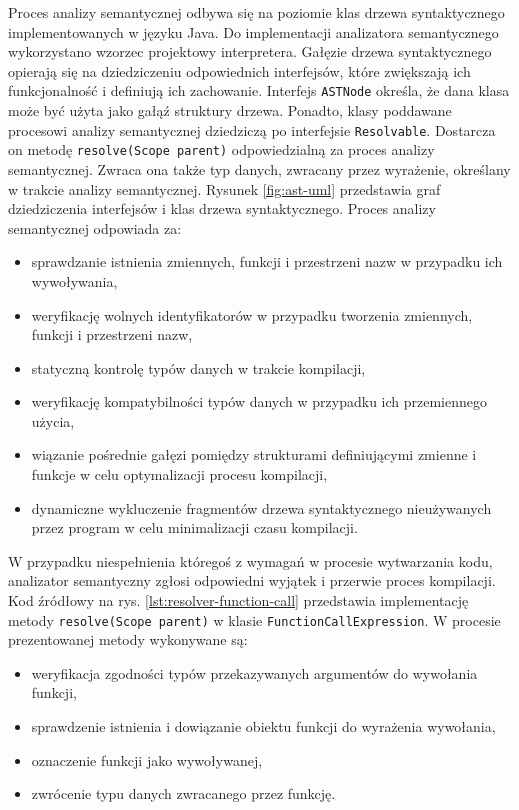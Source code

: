 Proces analizy semantycznej odbywa się na poziomie klas drzewa syntaktycznego implementowanych w języku Java. Do implementacji analizatora semantycznego wykorzystano wzorzec projektowy interpretera. Gałęzie drzewa syntaktycznego opierają się na dziedziczeniu odpowiednich interfejsów, które zwiększają ich funkcjonalność i definiują ich zachowanie. Interfejs \lstinline|ASTNode| określa, że dana klasa może być użyta jako gałąź struktury drzewa. Ponadto, klasy poddawane procesowi analizy semantycznej dziedziczą po interfejsie \lstinline|Resolvable|. Dostarcza on metodę \lstinline|resolve(Scope parent)| odpowiedzialną za proces analizy semantycznej. Zwraca ona także typ danych, zwracany przez wyrażenie, określany w trakcie analizy semantycznej. Rysunek \ref{fig:ast-uml} przedstawia graf dziedziczenia interfejsów i klas drzewa syntaktycznego. Proces analizy semantycznej odpowiada za:
\begin{itemize}
\item sprawdzanie istnienia zmiennych, funkcji i przestrzeni nazw w przypadku ich wywoływania,
\item weryfikację wolnych identyfikatorów w przypadku tworzenia zmiennych, funkcji i przestrzeni nazw,
\item statyczną kontrolę typów danych w trakcie kompilacji,
\item weryfikację kompatybilności typów danych w przypadku ich przemiennego użycia,
\item wiązanie pośrednie gałęzi pomiędzy strukturami definiującymi zmienne i funkcje w celu optymalizacji procesu kompilacji,
\item dynamiczne wykluczenie fragmentów drzewa syntaktycznego nieużywanych przez program w celu minimalizacji czasu kompilacji.
\end{itemize}
W przypadku niespełnienia któregoś z wymagań w procesie wytwarzania kodu, analizator semantyczny zgłosi odpowiedni wyjątek i przerwie proces kompilacji. Kod źródłowy na rys.  \ref{lst:resolver-function-call} przedstawia implementację metody \lstinline|resolve(Scope parent)| w klasie \mbox{\lstinline|FunctionCallExpression|.} W procesie prezentowanej metody wykonywane są:
\begin{itemize}
\item weryfikacja zgodności typów przekazywanych argumentów do wywołania funkcji,
\item sprawdzenie istnienia i dowiązanie obiektu funkcji do wyrażenia wywołania,
\item oznaczenie funkcji jako wywoływanej,
\item zwrócenie typu danych zwracanego przez funkcję.
\end{itemize}
